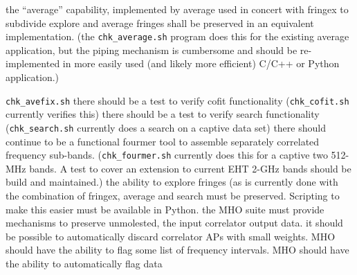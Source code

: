 \begin{description}
 the ``average'' capability, implemented by \ac{average}
    used in concert with \ac{fringex} to subdivide explore and average
    fringes shall be preserved in an equivalent implementation.
    (the \texttt{chk\_average.sh} program does this for the existing
    \ac{average} application, but the piping mechanism is cumbersome
    and should be re-implemented in more easily used (and likely more
    efficient) C/C++ or \ac{Python} application.)

    \texttt{chk\_avefix.sh}
 there should be a test to verify \acs{cofit} functionality
    (\texttt{chk\_cofit.sh} currently verifies this)
 there should be a test to verify \acs{search} functionality
    (\texttt{chk\_search.sh} currently does a search on a captive
    data set)
 there should continue to be a functional \acs{fourmer} tool
    to assemble separately correlated frequency sub-bands.
    (\texttt{chk\_fourmer.sh} currently does this for a
    captive two 512-MHz bands.  A test to cover an extension
    to current \acs{EHT} 2-GHz bands should be build and maintained.)
 the ability to explore fringes (as is currently done with
    the combination of \ac{fringex}, \ac{average} and search must be
    preserved.  Scripting to make this easier must be available in
    \ac{Python}.
 the \ac{MHO} suite must provide mechanisms to preserve
    unmolested, the input correlator output data.
 it should be possible to automatically discard correlator
    \acsp{AP} with small weights.
 \ac{MHO} should have the ability to flag some list of frequency
    intervals.
 \ac{MHO} should have the ability to automatically flag data


\end{description}
